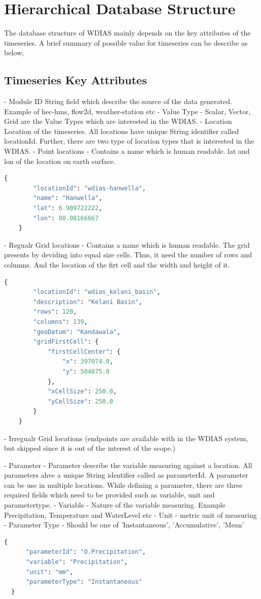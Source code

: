 \section{Hierarchical Database Structure}
 
The database structure of WDIAS mainly depends on the key attributes of the timeseries. A brief summary of possible value for timeseries can be describe as below;

\subsection{Timeseries Key Attributes}
- Module ID
  String field which describe the source of the data generated. Example of hec-hms, flow2d, weather-station etc
- Value Type
  - Scalar, Vector, Grid are the Value Types which are interested in the WDIAS.
- Location
  Location of the timeseries. All locations have unique String identifier called locationId. Further, there are two type of location types that is interested in the WDIAS.
  - Point locations - Contains a name which is human readable. lat and lon of the location on earth surface.
  \begin{lstlisting}[language=Python]
    {
        "locationId": "wdias-hanwella",
        "name": "Hanwella",
        "lat": 6.909722222,
        "lon": 80.08166667
    }
  \end{lstlisting}
  - Regualr Grid locations - Contains a name which is human readable. The grid presents by deviding into equal size cells. Thus, it need the number of rows and columns. 
  And the location of the firt cell and the width and height of it.
  \begin{lstlisting}[language=Python]
      {
        "locationId": "wdias_kelani_basin",
        "description": "Kelani Basin",
        "rows": 120,
        "columns": 139,
        "geoDatum": "Kandawala",
        "gridFirstCell": {
            "firstCellCenter": {
                "x": 397074.0,
                "y": 504875.0
            },
            "xCellSize": 250.0,
            "yCellSize": 250.0
        }
    }
\end{lstlisting}
  - Irregualr Grid locations (endpoints are available with in the WDIAS system, but skipped since it is out of the interest of the scope.)

- Parameter - Parameter describe the variable measuring against a location. All parameters ahve a unique String identifier called as parameterId. A parameter can be use in multiple locations.
While defining a parameter, there are three required fields which need to be provided such as variable, unit and parametertype.
- Variable - Nature of the variable measuring. Example Precipitation, Temperature and WaterLevel etc
- Unit - metric unit of measuring
- Parameter Type - Should be one of 'Instantaneous', 'Accumulative', 'Mean'
  \begin{lstlisting}[language=Python]
  {
      "parameterId": "O.Precipitation",
      "variable": "Precipitation",
      "unit": "mm",
      "parameterType": "Instantaneous"
  }
  \end{lstlisting}

